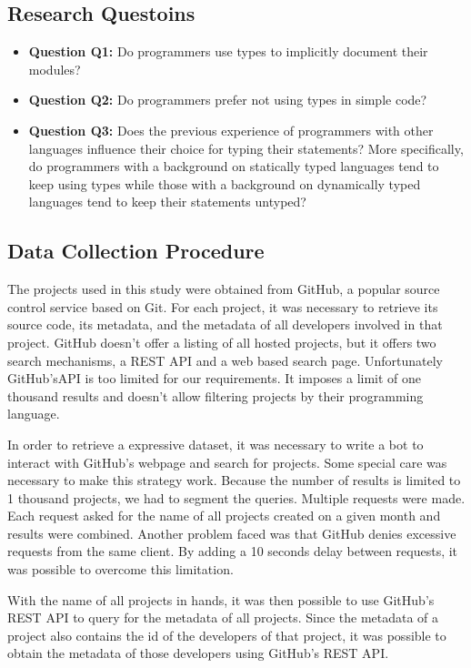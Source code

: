 \documentclass[preprint]{sigplanconf}
\begin{document}
\subsection{Research Questoins\label{questions}}


\begin{itemize}
	\item \textbf{Question Q1:} Do programmers use types to implicitly document their modules?
	\item \textbf{Question Q2:} Do programmers prefer not using types in simple code?	
	\item \textbf{Question Q3:} Does the previous experience of programmers with other languages influence their choice for typing their statements? More specifically, do programmers with a background on statically typed languages tend to keep using types while those with a background on dynamically typed languages tend to keep their statements untyped?
\end{itemize}

\subsection{Data Collection Procedure\label{dataCollection}}
The projects used in this study were obtained from GitHub, a popular source control service based on Git.
For each project, it was necessary to retrieve its source code, its metadata, and the metadata of all developers involved in that project.
GitHub doesn't offer a listing of all hosted projects, but it offers two search mechanisms, a REST API and a web based search page.
Unfortunately GitHub'sAPI is too limited for our requirements.
It imposes a limit of one thousand results and doesn't allow filtering projects by their programming language.

In order to retrieve a expressive dataset, it was necessary to write a bot to interact with GitHub's webpage and search for projects. 
Some special care was necessary to make this strategy work. 
Because the number of results is limited to 1 thousand projects, we had to segment the queries.
Multiple requests were made.
Each request asked for the name of all projects created on a given month and results were combined.
Another problem faced was that GitHub denies excessive requests from the same client.
By adding a 10 seconds delay between requests, it was possible to overcome this limitation.

With the name of all projects in hands, it was then possible to use GitHub's REST API to query for the metadata of all projects.
Since the metadata of a project also contains the id of the developers of that project, it was possible to obtain the metadata of those developers using GitHub's REST API.
\end{document}
